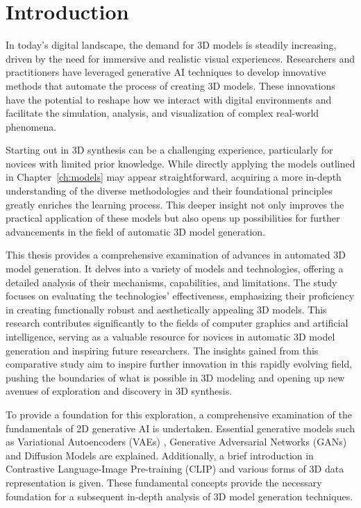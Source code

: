 \chapter{Introduction}
\label{ch:introduction}

In today's digital landscape, the demand for 3D models is steadily increasing, driven by the need for immersive and realistic visual experiences. Researchers and practitioners have leveraged generative AI techniques to develop innovative methods that automate the process of creating 3D models. These innovations have the potential to reshape how we interact with digital environments and facilitate the simulation, analysis, and visualization of complex real-world phenomena.

Starting out in 3D synthesis can be a challenging experience, particularly for novices with limited prior knowledge. While directly applying the models outlined in Chapter~\ref{ch:models} may appear straightforward, acquiring a more in-depth understanding of the diverse methodologies and their foundational principles greatly enriches the learning process. This deeper insight not only improves the practical application of these models but also opens up possibilities for further advancements in the field of automatic 3D model generation.

This thesis provides a comprehensive examination of advances in automated 3D model generation. It delves into a variety of models and technologies, offering a detailed analysis of their mechanisms, capabilities, and limitations. The study focuses on evaluating the technologies' effectiveness, emphasizing their proficiency in creating functionally robust and aesthetically appealing 3D models. This research contributes significantly to the fields of computer graphics and artificial intelligence, serving as a valuable resource for novices in automatic 3D model generation and inspiring future researchers. The insights gained from this comparative study aim to inspire further innovation in this rapidly evolving field, pushing the boundaries of what is possible in 3D modeling and opening up new avenues of exploration and discovery in 3D synthesis.

To provide a foundation for this exploration, a comprehensive examination of the fundamentals of 2D generative AI is undertaken.  Essential generative models such as Variational Autoencoders (VAEs) \citep{kingmaVAE,rezendeVAE}, Generative Adversarial Networks (GANs) \citep{goodfellowGAN} and Diffusion Models \citep{yangdiffusionSummary,hoDDPMs, sohlDDPM} are explained. Additionally, a brief introduction in Contrastive Language-Image Pre-training (CLIP) \citep{radfordCLIP} and various forms of 3D data representation is given. These fundamental concepts provide the necessary foundation for a subsequent in-depth analysis of 3D model generation techniques.

